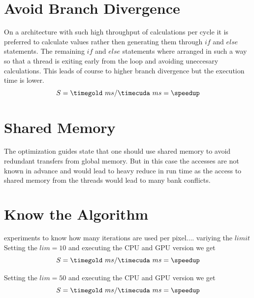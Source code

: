\section{Avoid Branch Divergence} %
\label{sec:avoid_branch_divergence}
On a architecture with such high throughput of calculations per cycle it is preferred
to calculate values rather then generating them through $if$ and $else$ statements.
The remaining $if$ and $else$ statements where arranged in such a way so that a 
thread is exiting early from the loop and avoiding uneccesary calculations. This leads
of course to higher branch divergence but the execution time is lower. 
\fpDiv{\speedup}{\timegold}{\timecuda}
\begin{equation*}\label{eq:speedup0}
	S = \timegold\ ms/\timecuda\ ms = \speedup
\end{equation*}

\section{Shared Memory} %
\label{sec:shared_memory}
The optimization guides state that one should use shared memory to avoid 
redundant transfers from global memory. But in this case the accesses are not 
known in advance and would lead to heavy reduce in run time as the access to 
shared memory from the threads would lead to many bank conflicts. 

\section{Know the Algorithm} %
\label{sec:know_the_algo}

experiments to know how many iterations are used per pixel.... 
variying the $limit$
Setting the $lim = 10$ and executing the \gls{CPU} and \gls{GPU} version we get
\fpDiv{\speedup}{\tgold}{\tcuda}
\begin{equation*}\label{eq:speedup0}
	S = \timegold\ ms/\timecuda\ ms = \speedup
\end{equation*}


Setting the $lim = 50$ and executing the \gls{CPU} and \gls{GPU} version we get
\fpDiv{\speedup}{\tgold}{\tcuda}
\begin{equation*}\label{eq:speedup0}
	S = \timegold\ ms/\timecuda\ ms = \speedup
\end{equation*}


